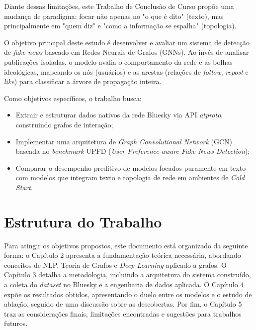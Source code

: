 Diante dessas limitações, este Trabalho de Conclusão de Curso propõe uma mudança de paradigma: focar não apenas no "o que é dito" (texto), mas principalmente em "quem diz" e "como a informação se espalha" (topologia). 

O objetivo principal deste estudo é desenvolver e avaliar um sistema de detecção de \textit{fake news} baseado em Redes Neurais de Grafos (GNNs). Ao invés de analisar publicações isoladas, o modelo avalia o comportamento da rede e as bolhas ideológicas, mapeando os nós (usuários) e as arestas (relações de \textit{follow}, \textit{repost} e \textit{like}) para classificar a árvore de propagação inteira. 

Como objetivos específicos, o trabalho busca:
\begin{itemize}
    \item Extrair e estruturar dados nativos da rede Bluesky via API \textit{atproto}, construindo grafos de interação;
    \item Implementar uma arquitetura de \textit{Graph Convolutional Network} (GCN) baseada no \textit{benchmark} UPFD (\textit{User Preference-aware Fake News Detection});
    \item Comparar o desempenho preditivo de modelos focados puramente em texto com modelos que integram texto e topologia de rede em ambientes de \textit{Cold Start}.
\end{itemize}

\section{Estrutura do Trabalho}

Para atingir os objetivos propostos, este documento está organizado da seguinte forma: o Capítulo 2 apresenta a fundamentação teórica necessária, abordando conceitos de NLP, Teoria de Grafos e \textit{Deep Learning} aplicado a grafos. O Capítulo 3 detalha a metodologia, incluindo a arquitetura do sistema construído, a coleta do \textit{dataset} no Bluesky e a engenharia de dados aplicada. O Capítulo 4 expõe os resultados obtidos, apresentando o duelo entre os modelos e o estudo de ablação, seguido de uma discussão sobre as descobertas. Por fim, o Capítulo 5 traz as considerações finais, limitações encontradas e sugestões para trabalhos futuros.
